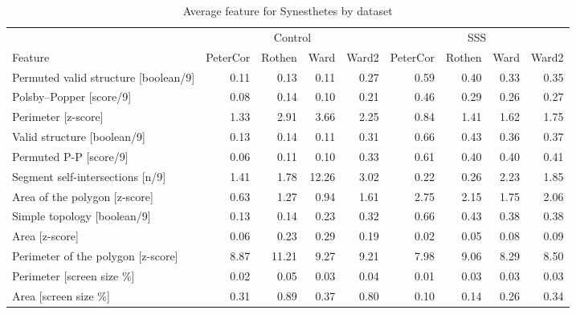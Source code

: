 \documentclass[
  man,
  floatsintext,
  longtable,
  a4paper,
  nolmodern,
  notxfonts,
  notimes,
  colorlinks=true,linkcolor=blue,citecolor=blue,urlcolor=blue]{apa7}
\begin{document}
\begin{table}

{\caption{{Average feature for Synesthetes by
dataset}{\label{tbl-apx02}}}
\vspace{-20pt}}

\fontsize{12.0pt}{14.0pt}\selectfont
\begin{tabular*}{\linewidth}{@{\extracolsep{\fill}}>{\raggedright\arraybackslash}p{\dimexpr 112.50pt -2\tabcolsep-1.5\arrayrulewidth}rrrrrrrr}
\toprule
 & \multicolumn{4}{c}{{Control}} & \multicolumn{4}{c}{{SSS}} \\ 
\cmidrule(lr){2-5} \cmidrule(lr){6-9}
Feature & PeterCor & Rothen & Ward & Ward2 & PeterCor & Rothen & Ward & Ward2 \\ 
\midrule\addlinespace[2.5pt]
Permuted valid structure [boolean/9] & 0.11 &  0.13 &  0.11 & 0.27 & 0.59 & 0.40 & 0.33 & 0.35 \\ 
Polsby–Popper [score/9] & 0.08 &  0.14 &  0.10 & 0.21 & 0.46 & 0.29 & 0.26 & 0.27 \\ 
Perimeter [z-score] & 1.33 &  2.91 &  3.66 & 2.25 & 0.84 & 1.41 & 1.62 & 1.75 \\ 
Valid structure [boolean/9] & 0.13 &  0.14 &  0.11 & 0.31 & 0.66 & 0.43 & 0.36 & 0.37 \\ 
Permuted P-P [score/9] & 0.06 &  0.11 &  0.10 & 0.33 & 0.61 & 0.40 & 0.40 & 0.41 \\ 
Segment self-intersections [n/9] & 1.41 &  1.78 & 12.26 & 3.02 & 0.22 & 0.26 & 2.23 & 1.85 \\ 
Area of the polygon [z-score] & 0.63 &  1.27 &  0.94 & 1.61 & 2.75 & 2.15 & 1.75 & 2.06 \\ 
Simple topology [boolean/9] & 0.13 &  0.14 &  0.23 & 0.32 & 0.66 & 0.43 & 0.38 & 0.38 \\ 
Area [z-score] & 0.06 &  0.23 &  0.29 & 0.19 & 0.02 & 0.05 & 0.08 & 0.09 \\ 
Perimeter of the polygon [z-score] & 8.87 & 11.21 &  9.27 & 9.21 & 7.98 & 9.06 & 8.29 & 8.50 \\ 
Perimeter [screen size \%] & 0.02 &  0.05 &  0.03 & 0.04 & 0.01 & 0.03 & 0.03 & 0.03 \\ 
Area [screen size \%] & 0.31 &  0.89 &  0.37 & 0.80 & 0.10 & 0.14 & 0.26 & 0.34 \\ 
\bottomrule
\end{tabular*}

\end{table}
\end{document}

